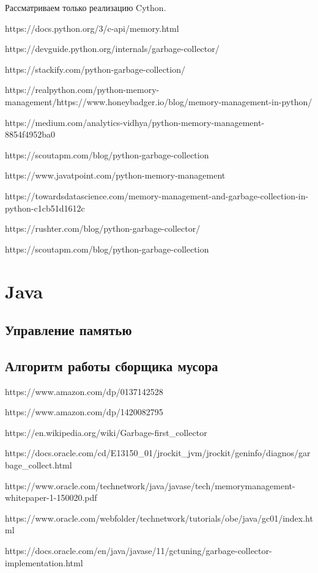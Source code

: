 Рассматриваем только реализацию Cython.

https://docs.python.org/3/c-api/memory.html

https://devguide.python.org/internals/garbage-collector/

https://stackify.com/python-garbage-collection/

https://realpython.com/python-memory-management/https://www.honeybadger.io/blog/memory-management-in-python/

https://medium.com/analytics-vidhya/python-memory-management-8854f4952ba0

https://scoutapm.com/blog/python-garbage-collection



https://www.javatpoint.com/python-memory-management

https://towardsdatascience.com/memory-management-and-garbage-collection-in-python-c1cb51d1612c

https://rushter.com/blog/python-garbage-collector/

https://scoutapm.com/blog/python-garbage-collection





\section{Java}
\subsection{Управление памятью}
\subsection{Алгоритм работы сборщика мусора}

https://www.amazon.com/dp/0137142528

https://www.amazon.com/dp/1420082795



https://en.wikipedia.org/wiki/Garbage-first\_collector



https://docs.oracle.com/cd/E13150\_01/jrockit\_jvm/jrockit/geninfo/diagnos/garbage\_collect.html

https://www.oracle.com/technetwork/java/javase/tech/memorymanagement-whitepaper-1-150020.pdf

https://www.oracle.com/webfolder/technetwork/tutorials/obe/java/gc01/index.html

https://docs.oracle.com/en/java/javase/11/gctuning/garbage-collector-implementation.html

